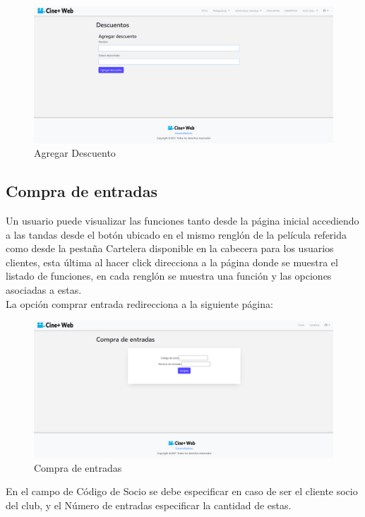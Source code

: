 \begin{figure}[h!]
	\centering
	\includegraphics[scale=0.35]{./chapters/img/add_discount.png}
	
	\label{fig:add_discount}
	\caption{Agregar Descuento}
	
\end{figure}

\subsection{Compra de entradas}
Un usuario puede visualizar las funciones tanto desde la p\'agina inicial accediendo a las tandas desde el bot\'on ubicado en el mismo rengl\'on de la pel\'icula referida como desde la pesta\~na Cartelera disponible en la cabecera para los usuarios clientes, esta \'ultima al hacer click direcciona a la p\'agina donde se muestra el listado de funciones, en cada rengl\'on se muestra una funci\'on y las opciones asociadas a estas.\\

La opci\'on comprar entrada redirecciona a la siguiente p\'agina:
\begin{figure}[h!]
	\centering
	\includegraphics[scale=0.35]{./chapters/img/ticketpurchase1.png}
	
	\label{fig:ticketpurchase1}
	\caption{Compra de entradas}
	
\end{figure}

En el campo de C\'odigo de Socio se debe especificar en caso de ser el cliente socio del club, y el N\'umero de entradas especificar la cantidad de estas.